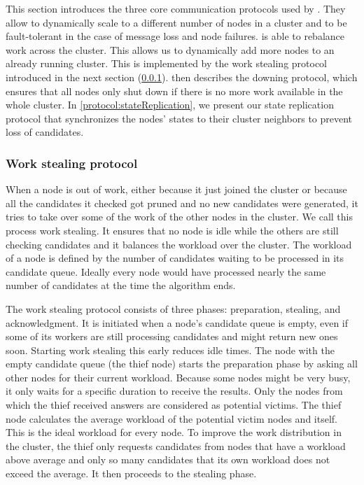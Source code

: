   This section introduces the three core communication protocols used by \dodo{}.
  They allow \dodo{} to dynamically scale to a different number of nodes in a cluster and to be fault-tolerant in the case of message loss and node failures.
  \dodo{} is able to rebalance work across the cluster.
  This allows us to dynamically add more nodes to an already running cluster.
  This is implemented by the work stealing protocol introduced in the next section (\cref{protocol:workStealing}).
   then describes the downing protocol, which ensures that all nodes only shut down if there is no more work available in the whole cluster.
  In \cref{protocol:stateReplication}, we present our state replication protocol that synchronizes the nodes' states to their cluster neighbors to prevent loss of candidates.

\subsubsection{Work stealing protocol}\label{protocol:workStealing}

  When a node is out of work, either because it just joined the cluster or because all the candidates it checked got pruned and no new candidates were generated, it tries to take over some of the work of the other nodes in the cluster.
  We call this process work stealing.
  It ensures that no node is idle while the others are still checking candidates and it balances the workload over the cluster.
  The workload of a node is defined by the number of candidates waiting to be processed in its candidate queue.
  Ideally every node would have processed nearly the same number of candidates at the time the algorithm ends.

  The work stealing protocol consists of three phases: preparation, stealing, and acknowledgment.
  It is initiated when a node's candidate queue is empty, even if some of its workers are still processing candidates and might return new ones soon.
  Starting work stealing this early reduces idle times.
  The node with the empty candidate queue (the thief node) starts the preparation phase by asking all other nodes for their current workload.
  Because some nodes might be very busy, it only waits for a specific duration to receive the results.
  Only the nodes from which the thief received answers are considered as potential victims.
  The thief node calculates the average workload of the potential victim nodes and itself.
  This is the ideal workload for every node.
  To improve the work distribution in the cluster, the thief only requests candidates from nodes that have a workload above average and only so many candidates that its own workload does not exceed the average.
  It then proceeds to the stealing phase.

